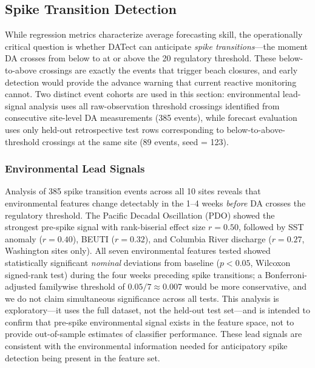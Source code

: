 \documentclass[toxins,article,submit,moreauthors]{Definitions/mdpi}
\begin{document}
\subsection{Spike Transition Detection}
\label{sec:results-spike}

While regression metrics characterize average forecasting skill, the operationally critical question is whether DATect can anticipate \emph{spike transitions}---the moment DA crosses from below to at or above the \SI{20}{\microgrampeg} regulatory threshold. These below-to-above crossings are exactly the events that trigger beach closures, and early detection would provide the advance warning that current reactive monitoring cannot. Two distinct event cohorts are used in this section: environmental lead-signal analysis uses all raw-observation threshold crossings identified from consecutive site-level DA measurements (385 events), while forecast evaluation uses only held-out retrospective test rows corresponding to below-to-above-threshold crossings at the same site (89 events, seed = 123).

\subsubsection{Environmental Lead Signals}
\label{sec:results-env-lead}

Analysis of 385 spike transition events across all 10 sites reveals that environmental features change detectably in the 1--4 weeks \emph{before} DA crosses the regulatory threshold. The Pacific Decadal Oscillation (PDO) showed the strongest pre-spike signal with rank-biserial effect size $r = 0.50$, followed by SST anomaly ($r = 0.40$), BEUTI ($r = 0.32$), and Columbia River discharge ($r = 0.27$, Washington sites only). All seven environmental features tested showed statistically significant \emph{nominal} deviations from baseline ($p < 0.05$, Wilcoxon signed-rank test) during the four weeks preceding spike transitions; a Bonferroni-adjusted familywise threshold of $0.05/7 \approx 0.007$ would be more conservative, and we do not claim simultaneous significance across all tests. This analysis is exploratory---it uses the full dataset, not the held-out test set---and is intended to confirm that pre-spike environmental signal exists in the feature space, not to provide out-of-sample estimates of classifier performance. These lead signals are consistent with the environmental information needed for anticipatory spike detection being present in the feature set.
\end{document}
